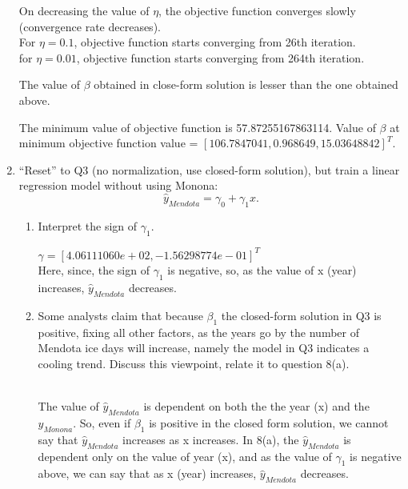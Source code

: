 \documentclass[a4paper]{article}
\theoremstyle{definition}
\newenvironment{soln}{
    \leavevmode\color{blue}\ignorespaces
}{}
\begin{document}
\begin{enumerate}
\begin{soln}
On decreasing the value of $\eta$, the objective function converges slowly (convergence rate decreases).
\\For $\eta = 0.1$, objective function starts converging from 26th iteration.
\\for $\eta = 0.01$, objective function starts converging from 264th iteration.

The value of $\beta$ obtained in close-form solution is lesser than the one obtained above.

The minimum value of objective function is 57.87255167863114. Value of $\beta$ at minimum objective function value = $[106.7847041,0.968649,15.03648842]^T$. 

\end{soln}


\item 
``Reset'' to Q3 (no normalization,  use closed-form solution), but train a linear regression model without using Monona:
$$\hat y_{Mendota} = \gamma_0 + \gamma_1 x.$$
  \begin{enumerate}
  \item Interpret the sign of $\gamma_1$.

  \begin{soln}
  $\gamma = [ 4.06111060e+02,-1.56298774e-01]^T$
  \\Here, since, the sign of $\gamma_1$ is negative, so, as the value of x (year) increases, $\hat y_{Mendota}$ decreases.
  \end{soln}

  \item Some analysts claim that because $\beta_1$ the closed-form solution in Q3 is positive, fixing all other factors, as the years go by the number of Mendota ice days will increase, namely the model in Q3 indicates a cooling trend. Discuss this viewpoint, relate it to question 8(a).
 \begin{soln}
\\The value of $\hat y_{Mendota}$ is dependent on both the the year (x) and the $y_{Monona}$. So, even if $\beta_1$ is positive in the closed form solution, we cannot say that $\hat y_{Mendota}$ increases as x increases. In 8(a), the  $\hat y_{Mendota}$ is dependent only on the value of year (x), and as the value of $\gamma_1$ is negative above, we can say that as x (year) increases, $\hat y_{Mendota}$ decreases.

 \end{soln}

  \end{enumerate}


\end{enumerate}
\end{document}
